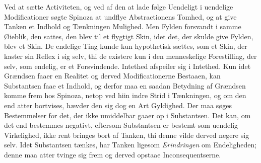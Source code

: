 \documentclass[12pt,a4paper]{book}
\newcommand{\opage}[1]{\marginnote{\footnotesize\textit{[#1]}}}
\begin{document}
Ved at sætte Activiteten, og ved af den at lade følge Uendeligt i
uendelige Modificationer søgte Spinoza at undflye Abstractionens
Tomhed, og at give Tanken et Indhold og Tænkningen Mulighed. Men
Fylden forsvandt i samme Øieblik, den sattes, den blev til et
flygtigt Skin, idet det, der skulde give Fylden, blev et Skin. De
endelige Ting kunde kun hypothetisk sættes, som et Skin, der kaster
sin Reflex i sig selv, thi de existere kun i den menneskelige
Forestilling, der selv, som endelig, er et Forsvindende. Intethed
afspeiler sig i Intethed. Kun idet Grændsen faaer en Realitet og
derved Modificationerne Bestaaen, kan Substantsen faae et Indhold, og
derfor maa en saadan Betydning af Grændsen komme frem hos Spinoza,
netop ved hiin indre Strid i Tænkningen, og om den end atter
bortvises, hævder den sig dog en Art Gyldighed. Der maa søges
Bestemmelser for det, der ikke umiddelbar gaaer op i Substantsen. Det
kan, om det end bestemmes negativt, eftersom Substantsen er bestemt
som uendelig Virkelighed, ikke rent bringes bort af Tanken, thi denne
vilde derved negere sig selv. Idet Substantsen tænkes, har Tanken
ligesom
\opage{63} \setcounter{footnote}{0}%
\emph{Erindringen} om Endeligheden; denne maa atter tvinge sig frem og
derved opstaae Inconsequentserne.
\end{document}
